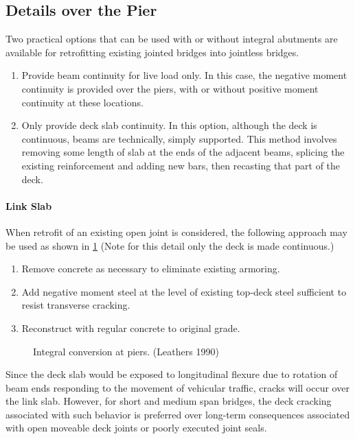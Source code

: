 \subsection{Details over the Pier}
Two practical options that can be used with or without integral abutments are available for retrofitting existing
jointed bridges into jointless bridges.

\begin{enumerate}
  \item Provide beam continuity for live load only. In this case, the negative moment continuity is provided over the piers, with or without positive moment continuity at these locations.
  \item Only provide deck slab continuity. In this option, although the deck is continuous, beams are technically, simply supported. This method involves removing some length of slab at the ends of the adjacent beams, splicing the existing reinforcement and adding new bars, then recasting that part of the deck.
\end{enumerate}

\paragraph*{Link Slab}
When retrofit of an existing open joint is considered, the following approach may be used as shown in \cref{fig:integral-conversion-piers} (Note for this detail only the deck is made continuous.)
\begin{enumerate}
  \item Remove concrete as necessary to eliminate existing armoring.
  \item Add negative moment steel at the level of existing top-deck steel sufficient to resist transverse cracking.
  \item Reconstruct with regular concrete to original grade.
\end{enumerate}

\begin{figure}
  \caption{Integral conversion at piers. (Leathers 1990)}
  \label{fig:integral-conversion-piers}
\end{figure}

Since the deck slab would be exposed to longitudinal flexure due to rotation of beam ends responding to the movement of vehicular traffic, cracks will occur over the link slab. However, for short and medium span bridges, the deck cracking associated with such behavior is preferred over long-term consequences associated with open moveable deck joints or poorly executed joint seals.

